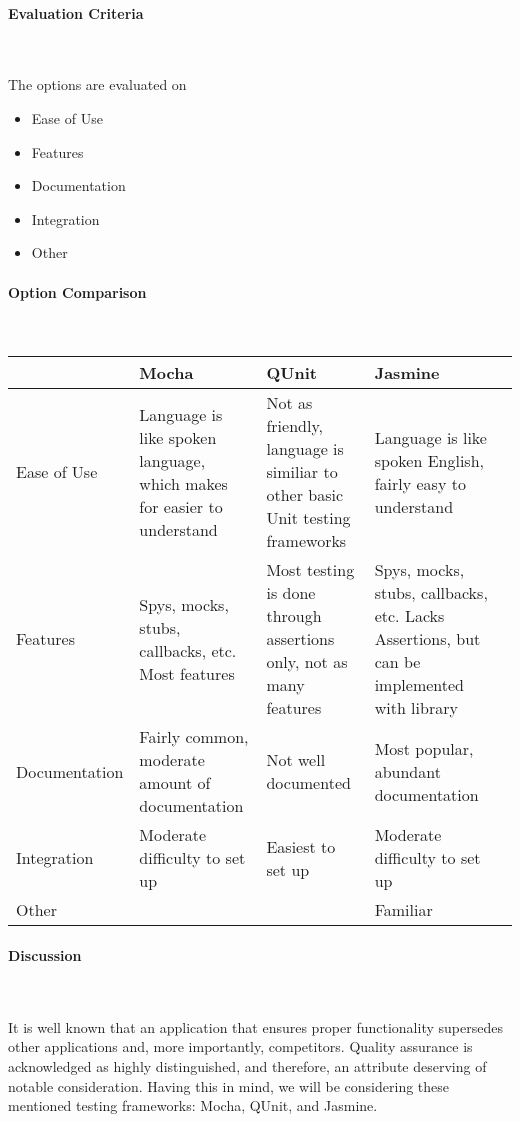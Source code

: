 \documentclass[letterpaper, 10pt, draftclsnofoot, compsoc, onecolumn]{IEEEtran}
\begin{document}
{\medskip
\newpage
\paragraph{Evaluation Criteria} ~\\
{\noindent The options are evaluated on

\begin{itemize}
\item Ease of Use
\item Features
\item Documentation
\item Integration
\item Other
\end{itemize}

 \par}


\newpage
\paragraph{Option Comparison} ~\\
\tablehead{}
\begin{supertabular}{|p{2cm}|p{2.5cm}|p{2.5cm}|p{2.5cm}|p{2.5cm}|}
\hline 
& Mocha 
& QUnit 
& Jasmine\\ \hline
Ease of Use 
	& Language is like spoken language, which makes for easier to understand 
	& Not as friendly, language is similiar to other basic Unit testing frameworks 	& Language is like spoken English, fairly easy to understand\\ \hline
Features & Spys, mocks, stubs, callbacks, etc. Most features & Most testing is done through assertions only, not as many features & Spys, mocks, stubs, callbacks, etc. Lacks Assertions, but can be implemented with library\\ \hline
Documentation & Fairly common, moderate amount of documentation & Not well documented & Most popular, abundant documentation \\ \hline
Integration & Moderate difficulty to set up & Easiest to set up & Moderate difficulty to set up\\ \hline
Other & & & Familiar\\ \hline
\end{supertabular}

\newpage
\paragraph{Discussion} ~\\
{\noindent It is well known that an application that ensures proper functionality supersedes other applications and, more importantly, competitors. Quality assurance is acknowledged as highly distinguished, and therefore, an attribute deserving of notable consideration. Having this in mind, we will be considering these mentioned testing frameworks: Mocha, QUnit, and Jasmine. \par}

}
\end{document}
